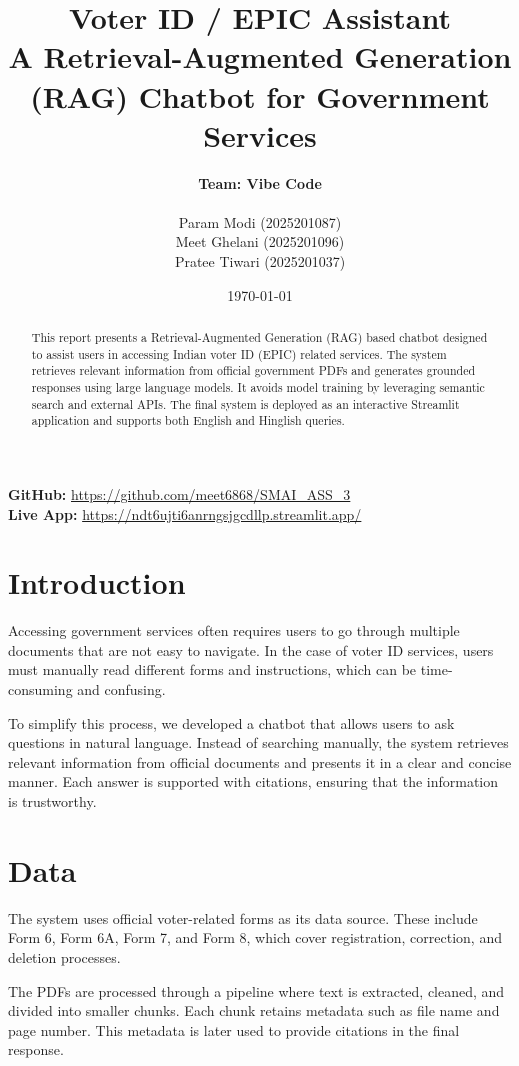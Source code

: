 \documentclass[11pt,a4paper]{article}
\title{\textbf{Voter ID / EPIC Assistant}\\
A Retrieval-Augmented Generation (RAG) Chatbot for Government Services}
\author{
\textbf{Team: Vibe Code} \\
\\
Param Modi (2025201087) \\
Meet Ghelani (2025201096) \\
Pratee Tiwari (2025201037)
}
\date{\today}
\begin{document}
\maketitle

\begin{center}
\textbf{GitHub:} \url{https://github.com/meet6868/SMAI_ASS_3} \\[4pt]
\textbf{Live App:} \url{https://ndt6ujti6anrngsjgcdllp.streamlit.app/}
\end{center}

\begin{abstract}
This report presents a Retrieval-Augmented Generation (RAG) based chatbot designed to assist users in accessing Indian voter ID (EPIC) related services. The system retrieves relevant information from official government PDFs and generates grounded responses using large language models. It avoids model training by leveraging semantic search and external APIs. The final system is deployed as an interactive Streamlit application and supports both English and Hinglish queries.
\end{abstract}

\section{Introduction}

Accessing government services often requires users to go through multiple documents that are not easy to navigate. In the case of voter ID services, users must manually read different forms and instructions, which can be time-consuming and confusing.

To simplify this process, we developed a chatbot that allows users to ask questions in natural language. Instead of searching manually, the system retrieves relevant information from official documents and presents it in a clear and concise manner. Each answer is supported with citations, ensuring that the information is trustworthy.

\section{Data}

The system uses official voter-related forms as its data source. These include Form 6, Form 6A, Form 7, and Form 8, which cover registration, correction, and deletion processes.

The PDFs are processed through a pipeline where text is extracted, cleaned, and divided into smaller chunks. Each chunk retains metadata such as file name and page number. This metadata is later used to provide citations in the final response.
\end{document}
